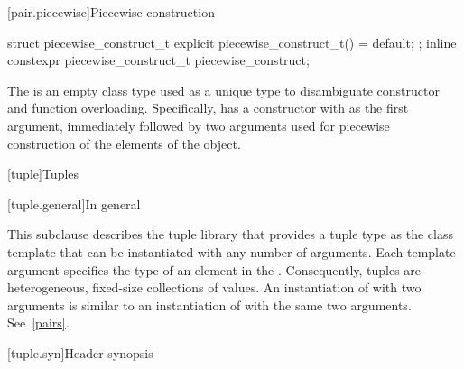 [pair.piecewise]{Piecewise construction}

%
%
\begin{itemdecl}
struct piecewise_construct_t {
  explicit piecewise_construct_t() = default;
};
inline constexpr piecewise_construct_t piecewise_construct{};
\end{itemdecl}

\pnum
The   is an empty class type
used as a unique type to disambiguate constructor and function overloading. Specifically,
 has a constructor with  as the
first argument, immediately followed by two  arguments used
for piecewise construction of the elements of the  object.

[tuple]{Tuples}

[tuple.general]{In general}

\pnum
{}%
This subclause describes the tuple library that provides a tuple type as
the class template  that can be instantiated with any number
of arguments. Each template argument specifies
the type of an element in the .  Consequently, tuples are
heterogeneous, fixed-size collections of values. An instantiation of  with
two arguments is similar to an instantiation of  with the same two arguments.
See~\ref{pairs}.

[tuple.syn]{Header  synopsis}

